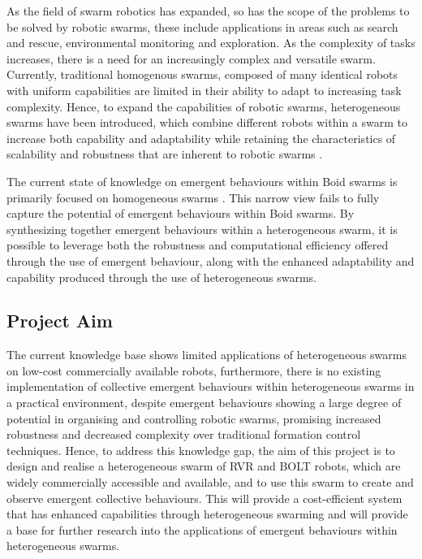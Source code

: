 \documentclass[conference]{IEEEtran}
\begin{document}
As the field of swarm robotics has expanded, so has the scope of the problems to be solved by robotic swarms, these include applications in areas such as search and rescue, environmental monitoring and exploration. As the complexity of tasks increases, there is a need for an increasingly complex and versatile swarm. Currently, traditional homogenous swarms, composed of many identical robots with uniform capabilities are limited in their ability to adapt to increasing task complexity. Hence, to expand the capabilities of robotic swarms, heterogeneous swarms have been introduced, which combine different robots within a swarm to increase both capability and adaptability while retaining the characteristics of scalability and robustness that are inherent to robotic swarms \cite{dorigo_swarmanoid_2013}.

The current state of knowledge on emergent behaviours within Boid swarms is primarily focused on homogeneous swarms \cite{jiang_learning_2019,stolfi_optimising_2022}. This narrow view fails to fully capture the potential of emergent behaviours within Boid swarms. By synthesizing together emergent behaviours within a heterogeneous swarm, it is possible to leverage both the robustness and computational efficiency offered through the use of emergent behaviour, along with the enhanced adaptability and capability produced through the use of heterogeneous swarms.

\subsection{Project Aim}

The current knowledge base shows limited applications of heterogeneous swarms on low-cost commercially available robots, furthermore, there is no existing implementation of collective emergent behaviours within heterogeneous swarms in a practical environment, despite emergent behaviours showing a large degree of potential in organising and controlling robotic swarms, promising increased robustness and decreased complexity over traditional formation control techniques. Hence, to address this knowledge gap, the aim of this project is to design and realise a heterogeneous swarm of RVR and BOLT robots, which are widely commercially accessible and available, and to use this swarm to create and observe emergent collective behaviours. This will provide a cost-efficient system that has enhanced capabilities through heterogeneous swarming and will provide a base for further research into the applications of emergent behaviours within heterogeneous swarms.      
\end{document}
